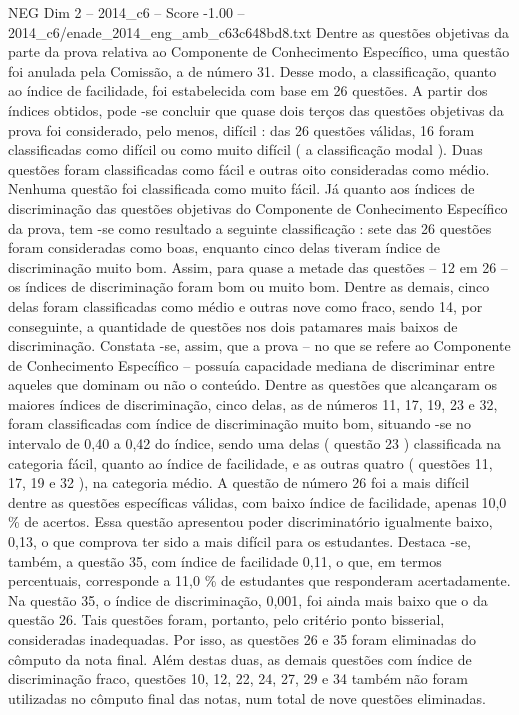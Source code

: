 \begin{textsample}{NEG Dim 2 – 2014\_c6 – Score -1.00 – 2014\_c6/enade\_2014\_eng\_amb\_c63c648bd8.txt}
Dentre as questões objetivas da parte da prova relativa ao Componente de Conhecimento Específico, uma questão foi anulada pela Comissão, a de número 31.
Desse modo, a classificação, quanto ao índice de facilidade, foi estabelecida com base em 26 questões.
A partir dos índices obtidos, pode -se concluir que quase dois terços das questões objetivas da prova foi considerado, pelo menos, difícil : das 26 questões válidas, 16 foram classificadas como difícil ou como muito difícil ( a classificação modal ).
Duas questões foram classificadas como fácil e outras oito consideradas como médio.
Nenhuma questão foi classificada como muito fácil.
Já quanto aos índices de discriminação das questões objetivas do Componente de Conhecimento Específico da prova, tem -se como resultado a seguinte classificação : sete das 26 questões foram consideradas como boas, enquanto cinco delas tiveram índice de discriminação muito bom.
Assim, para quase a metade das questões – 12 em 26 – os índices de discriminação foram bom ou muito bom.
Dentre as demais, cinco delas foram classificadas como médio e outras nove como fraco, sendo 14, por conseguinte, a quantidade de questões nos dois patamares mais baixos de discriminação.
Constata -se, assim, que a prova – no que se refere ao Componente de Conhecimento Específico – possuía capacidade mediana de discriminar entre aqueles que dominam ou não o conteúdo.
Dentre as questões que alcançaram os maiores índices de discriminação, cinco delas, as de números 11, 17, 19, 23 e 32, foram classificadas com índice de discriminação muito bom, situando -se no intervalo de 0,40 a 0,42 do índice, sendo uma delas ( questão 23 ) classificada na categoria fácil, quanto ao índice de facilidade, e as outras quatro ( questões 11, 17, 19 e 32 ), na categoria médio.
A questão de número 26 foi a mais difícil dentre as questões específicas válidas, com baixo índice de facilidade, apenas 10,0 \% de acertos.
Essa questão apresentou poder discriminatório igualmente baixo, 0,13, o que comprova ter sido a mais difícil para os estudantes.
Destaca -se, também, a questão 35, com índice de facilidade 0,11, o que, em termos percentuais, corresponde a 11,0 \% de estudantes que responderam acertadamente.
Na questão 35, o índice de discriminação, 0,001, foi ainda mais baixo que o da questão 26.
Tais questões foram, portanto, pelo critério ponto bisserial, consideradas inadequadas.
Por isso, as questões 26 e 35 foram eliminadas do cômputo da nota final.
Além destas duas, as demais questões com índice de discriminação fraco, questões 10, 12, 22, 24, 27, 29 e 34 também não foram utilizadas no cômputo final das notas, num total de nove questões eliminadas.

\end{textsample}
